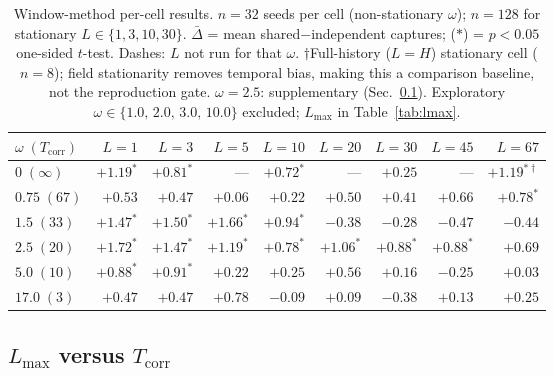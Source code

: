 \documentclass[sigconf,anonymous]{aamas}
\newcommand{\Dbar}{\bar{\Delta}}
\newcommand{\Lmax}{L_{\max}}
\newcommand{\Tcorr}{T_{\mathrm{corr}}}
\begin{document}
\begin{table}[t]
\centering
\caption{Window-method per-cell results.
         $n{=}32$ seeds per cell (non-stationary $\omega$);
         $n{=}128$ for stationary $L{\in}\{1,3,10,30\}$.
         $\Dbar$ = mean shared$-$independent captures;
         ($*$) = $p{<}0.05$ one-sided $t$-test.
         Dashes: $L$ not run for that $\omega$.
         $\dagger$Full-history ($L{=}H$) stationary cell ($n{=}8$);
         field stationarity removes temporal bias, making this
         a comparison baseline, not the reproduction gate.
         $\omega{=}2.5$: supplementary (Sec.~\ref{sec:lmax-scaling}).
         Exploratory $\omega{\in}\{1.0,\,2.0,\,3.0,\,10.0\}$ excluded;
         $\Lmax$ in Table~\ref{tab:lmax}.}
\label{tab:main}
\setlength\tabcolsep{5pt}
\begin{tabular}{lrrrrrrrr}
\toprule
$\omega\;(\Tcorr)$
  & $L{=}1$ & $L{=}3$ & $L{=}5$ & $L{=}10$
  & $L{=}20$ & $L{=}30$ & $L{=}45$ & $L{=}67$ \\
\midrule
$0\;(\infty)$
  & $+1.19^*$ & $+0.81^*$ & --- & $+0.72^*$
  & --- & $+0.25$ & --- & $+1.19^{*\dagger}$ \\
$0.75\;(67)$
  & $+0.53$ & $+0.47$ & $+0.06$ & $+0.22$
  & $+0.50$ & $+0.41$ & $+0.66$ & $+0.78^*$ \\
$1.5\;(33)$
  & $+1.47^*$ & $+1.50^*$ & $+1.66^*$ & $+0.94^*$
  & $-0.38$ & $-0.28$ & $-0.47$ & $-0.44$ \\
$2.5\;(20)$
  & $+1.72^*$ & $+1.47^*$ & $+1.19^*$ & $+0.78^*$
  & $+1.06^*$ & $+0.88^*$ & $+0.88^*$ & $+0.69$ \\
$5.0\;(10)$
  & $+0.88^*$ & $+0.91^*$ & $+0.22$ & $+0.25$
  & $+0.56$ & $+0.16$ & $-0.25$ & $+0.03$ \\
$17.0\;(3)$
  & $+0.47$ & $+0.47$ & $+0.78$ & $-0.09$
  & $+0.09$ & $-0.38$ & $+0.13$ & $+0.25$ \\
\bottomrule
\end{tabular}
\end{table}

\subsection{$\Lmax$ versus $\Tcorr$}
\label{sec:lmax-scaling}
\end{document}
